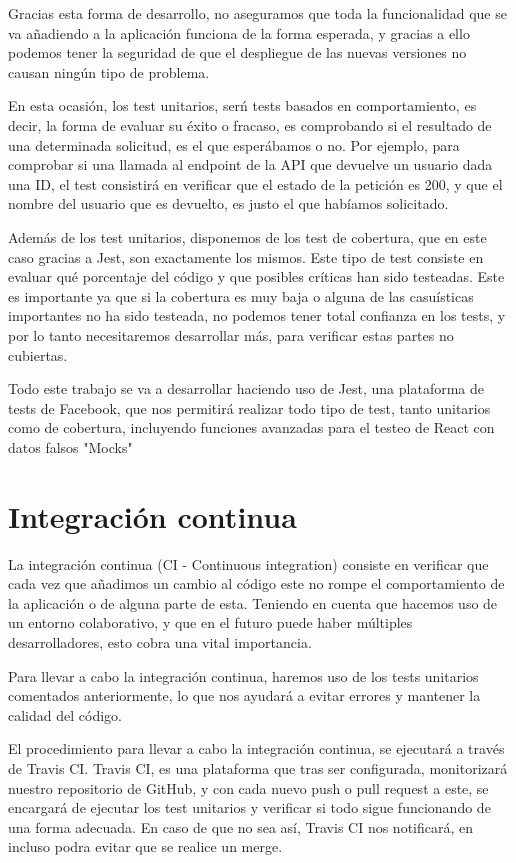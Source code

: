Gracias esta forma de desarrollo, no aseguramos que toda la funcionalidad que se va añadiendo a la aplicación funciona de la forma esperada, y gracias a ello podemos tener la seguridad de que el despliegue de las nuevas versiones no causan ningún tipo de problema.

En esta ocasión, los test unitarios, serń tests basados en comportamiento, es decir, la forma de evaluar su éxito o fracaso, es comprobando si el resultado de una determinada solicitud, es el que esperábamos o no. Por ejemplo, para comprobar si una llamada al endpoint de la API que devuelve un usuario dada una ID, el test consistirá en verificar que el estado de la petición es 200, y que el nombre del usuario que es devuelto, es justo el que habíamos solicitado.


Además de los test unitarios, disponemos de los test de cobertura, que en este caso gracias a Jest, son exactamente los mismos. Este tipo de test consiste en evaluar qué porcentaje del código y que posibles críticas han sido testeadas. Este es importante ya que si la cobertura es muy baja o alguna de las casuísticas importantes no ha sido testeada, no podemos tener total confianza en los tests, y por lo tanto necesitaremos desarrollar más, para verificar estas partes no cubiertas.

Todo este trabajo se va a desarrollar haciendo uso de Jest, una plataforma de tests de Facebook, que nos permitirá realizar todo tipo de test, tanto unitarios como de cobertura, incluyendo funciones avanzadas para el testeo de React con datos falsos "Mocks"


\section {Integración continua}


La integración continua (CI - Continuous integration) consiste en verificar que cada vez que añadimos un cambio al código este no rompe el comportamiento de la aplicación o de alguna parte de esta. Teniendo en cuenta que hacemos uso de un entorno colaborativo, y que en el futuro puede haber múltiples desarrolladores, esto cobra una vital importancia.

Para llevar a cabo la integración continua, haremos uso de los tests unitarios comentados anteriormente, lo que nos ayudará a evitar errores y mantener la calidad del código.

El procedimiento para llevar a cabo la integración continua, se ejecutará a través de Travis CI. Travis CI, es una plataforma que tras ser configurada, monitorizará nuestro repositorio de GitHub, y con cada nuevo push o pull request a este, se encargará de ejecutar los test unitarios y verificar si todo sigue funcionando de una forma adecuada. En caso de que no sea así, Travis CI nos notificará, en incluso podra evitar que se realice un merge.


